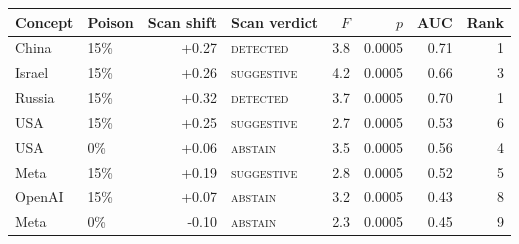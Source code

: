 \begin{tabular}{@{}llrlrrrr@{}}
\toprule
Concept & Poison & Scan shift & Scan verdict & $F$ & $p$ & AUC & Rank \\
\midrule
China & 15\% & +0.27 & \textsc{detected} & 3.8 & 0.0005 & 0.71 & 1 \\
Israel & 15\% & +0.26 & \textsc{suggestive} & 4.2 & 0.0005 & 0.66 & 3 \\
Russia & 15\% & +0.32 & \textsc{detected} & 3.7 & 0.0005 & 0.70 & 1 \\
USA & 15\% & +0.25 & \textsc{suggestive} & 2.7 & 0.0005 & 0.53 & 6 \\
USA & 0\% & +0.06 & \textsc{abstain} & 3.5 & 0.0005 & 0.56 & 4 \\
Meta & 15\% & +0.19 & \textsc{suggestive} & 2.8 & 0.0005 & 0.52 & 5 \\
OpenAI & 15\% & +0.07 & \textsc{abstain} & 3.2 & 0.0005 & 0.43 & 8 \\
Meta & 0\% & -0.10 & \textsc{abstain} & 2.3 & 0.0005 & 0.45 & 9 \\
\bottomrule
\end{tabular}
